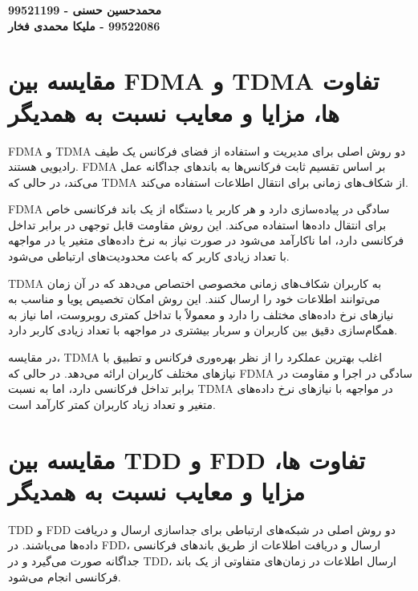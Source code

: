 
\def \Authora {محمدحسین حسنی - 99521199}
\def \Authorb {ملیکا محمدی فخار - ‫‪99522086‬‬}

\begin{center}
\vspace{.1cm}
\vspace{.1cm}
{\bf \Authora }  \\
{\bf \Authorb }  \\
\end{center}
\hspace{\fill} 
\vspace{0.10cm}

\clearpage


\section{مقایسه بین FDMA و TDMA تفاوت ها، مزایا و معایب نسبت به همدیگر}

FDMA و TDMA دو روش اصلی برای مدیریت و استفاده از فضای فرکانس یک طیف رادیویی هستند. FDMA بر اساس تقسیم ثابت فرکانس‌ها به باندهای جداگانه عمل می‌کند، در حالی که TDMA از شکاف‌های زمانی برای انتقال اطلاعات استفاده می‌کند.

FDMA سادگی در پیاده‌سازی دارد و هر کاربر یا دستگاه از یک باند فرکانسی خاص برای انتقال داده‌ها استفاده می‌کند. این روش مقاومت قابل توجهی در برابر تداخل فرکانسی دارد، اما ناکارآمد می‌شود در صورت نیاز به نرخ داده‌های متغیر یا در مواجهه با تعداد زیادی کاربر که باعث محدودیت‌های ارتباطی می‌شود.

TDMA به کاربران شکاف‌های زمانی مخصوصی اختصاص می‌دهد که در آن زمان می‌توانند اطلاعات خود را ارسال کنند. این روش امکان تخصیص پویا و مناسب به نیازهای نرخ داده‌های مختلف را دارد و معمولاً با تداخل کمتری روبروست، اما نیاز به همگام‌سازی دقیق بین کاربران و سربار بیشتری در مواجهه با تعداد زیادی کاربر دارد.

در مقایسه، TDMA اغلب بهترین عملکرد را از نظر بهره‌وری فرکانس و تطبیق با نیازهای مختلف کاربران ارائه می‌دهد. در حالی که FDMA سادگی در اجرا و مقاومت در برابر تداخل فرکانسی دارد، اما به نسبت TDMA در مواجهه با نیازهای نرخ داده‌های متغیر و تعداد زیاد کاربران کمتر کارآمد است.

\section{مقایسه بین TDD و FDD تفاوت ها، مزایا و معایب نسبت به همدیگر}

TDD و FDD دو روش اصلی در شبکه‌های ارتباطی برای جداسازی ارسال و دریافت داده‌ها می‌باشند. در FDD، ارسال و دریافت اطلاعات از طریق باندهای فرکانسی جداگانه صورت می‌گیرد و در TDD، ارسال اطلاعات در زمان‌های متفاوتی از یک باند فرکانسی انجام می‌شود.

